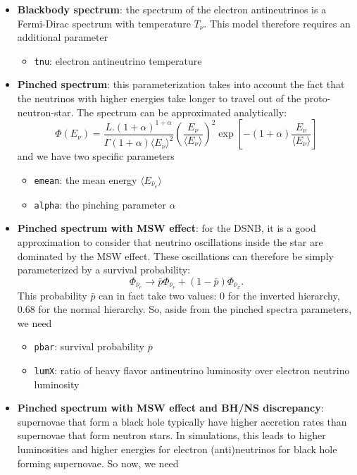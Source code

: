 \documentclass[12pt]{article}
\begin{document}
    \begin{itemize}
        \item \textbf{Blackbody spectrum}: the spectrum of the electron antineutrinos is a Fermi-Dirac spectrum with temperature $T_\nu$. This model therefore requires an additional parameter
            \begin{itemize}
                \item[] \texttt{tnu}: electron antineutrino temperature
            \end{itemize}
        \item \textbf{Pinched spectrum}: this parameterization takes into account the fact that the neutrinos with higher energies take longer to travel out of the proto-neutron-star. The spectrum can be approximated analytically:
            $$\Phi(E_\nu) = \frac{L.(1+\alpha)^{1+\alpha}}{\Gamma(1+\alpha)\langle E_\nu\rangle^2}\left(\frac{E_\nu}{\langle E_\nu\rangle}\right)^2\exp\left[-(1+\alpha)\frac{E_\nu}{\langle E_\nu\rangle}\right]$$
            and we have two specific parameters
            \begin{itemize}
                \item[] \texttt{emean}: the mean energy $\langle E_{\bar{\nu}_e}\rangle$
                \item[] \texttt{alpha}: the pinching parameter $\alpha$
            \end{itemize}
        \item \textbf{Pinched spectrum with MSW effect}: for the DSNB, it is a good approximation to consider that neutrino oscillations inside the star are dominated by the MSW effect. These oscillations can therefore be simply parameterized by a survival probability:
            $$\Phi_{\bar{\nu}_e} \rightarrow \bar{p} \Phi_{\bar{\nu}_e} + (1 - \bar{p})\Phi_{\bar{\nu}_x}.$$
            This probability $\bar{p}$ can in fact take two values: $0$ for the inverted hierarchy, $0.68$ for the normal hierarchy. So, aside from the pinched spectra parameters, we need 
            \begin{itemize}
                \item[] \texttt{pbar}: survival probability $\bar{p}$
                \item[] \texttt{lumX}: ratio of heavy flavor antineutrino luminosity over electron neutrino luminosity
            \end{itemize}
        \item \textbf{Pinched spectrum with MSW effect and BH/NS discrepancy}: supernovae that form a black hole typically have higher accretion rates than supernovae that form neutron stars. In simulations, this leads to higher luminosities and higher energies for electron (anti)neutrinos for black hole forming supernovae. So now, we need 

\end{itemize}
\end{document}
